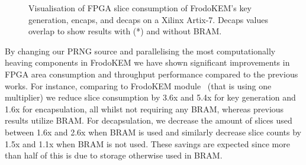 \begin{table}
\centering
\caption{FPGA resource consumption of the proposed PRNG and Error Sampler designs on a Xilinx Artix-7 FPGA.}\label{tab:otherresults}
\end{table}

\begin{figure}
\centering
\resizebox{\columnwidth}{!}{


}
\caption{Visualisation of FPGA slice consumption of FrodoKEM's key generation, encaps, and decaps on a Xilinx Artix-7. Decaps values overlap to show results with (*) and without BRAM.}
\label{fig:hw}
\end{figure}

By changing our PRNG source and parallelising the most computationally heaving components in FrodoKEM we have shown significant improvements in FPGA area consumption and throughput performance compared to the previous works. For instance, comparing to FrodoKEM module~\cite{howe2018standard} (that is using one multiplier) we reduce slice consumption by 3.6x and 5.4x for key generation and 1.6x for encapsulation, all whilst not requiring any BRAM, whereas previous results utilize BRAM. For decapsulation, we decrease the amount of slices used between 1.6x and 2.6x when BRAM is used and similarly decrease slice counts by 1.5x and 1.1x when BRAM is not used. These savings are expected since more than half of this is due to storage otherwise used in BRAM.

